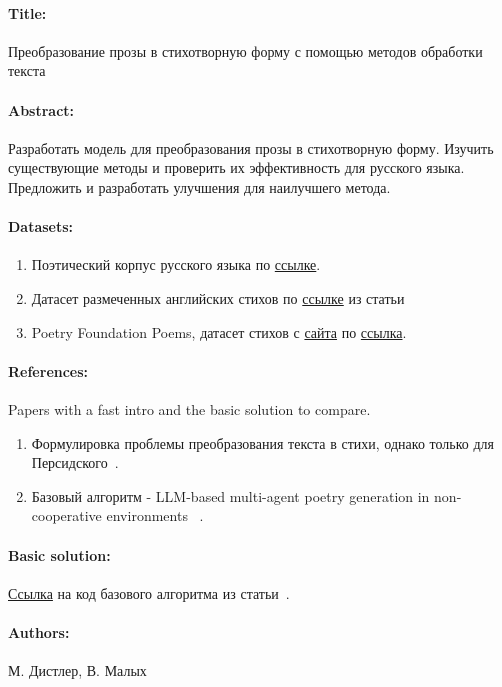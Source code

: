 \documentclass[12pt]{article}
\begin{document}
\paragraph{Title:} Преобразование прозы в стихотворную форму с помощью методов обработки текста

\paragraph{Abstract:} 
Разработать модель для преобразования прозы в стихотворную форму. Изучить существующие методы и проверить их эффективность для русского языка. Предложить и разработать улучшения для наилучшего метода.

\paragraph{Datasets:} 
\begin{enumerate}
\item Поэтический корпус русского языка по \href{https://github.com/IlyaGusev/PoetryCorpus}{ссылке}.
\item Датасет размеченных английских стихов по \href{https://github.com/potamides/uniformers?tab=readme-ov-file}{ссылке} из статьи~\cite{belouadi-eger-2023-bygpt5}
\item Poetry Foundation Poems, датасет стихов с \href{https://www.poetryfoundation.org/}{сайта} по  \href{https://www.kaggle.com/datasets/tgdivy/poetry-foundation-poems}{ссылка}. 
\end{enumerate}

\paragraph{References:}  Papers with a fast intro and the basic solution to compare.
\begin{enumerate}
\item Формулировка проблемы преобразования текста в стихи, однако только для Персидского~\cite{Prose2PoemPersian}.
\item Базовый алгоритм - LLM-based multi-agent poetry generation in non-cooperative environments ~\cite{zhang2024llmbasedmultiagentpoetrygeneration}.
\end{enumerate}

\paragraph{Basic solution:} \href{https://github.com/zhangr2021/Multiagent_poetry}{Ссылка} на код базового алгоритма из статьи~\cite{zhang2024llmbasedmultiagentpoetrygeneration}. 

\paragraph{Authors:} М. Дистлер, В. Малых




\end{document}
